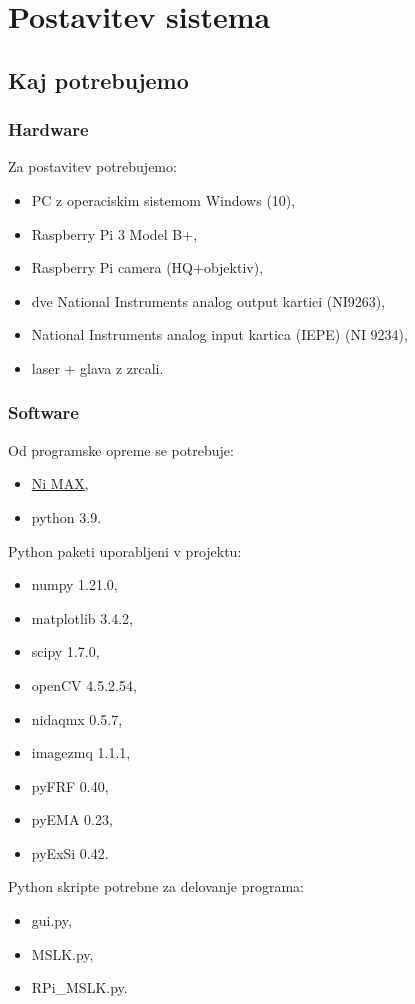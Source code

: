 \chapter{Postavitev sistema}
\section{Kaj potrebujemo}
\subsection{Hardware}
Za postavitev potrebujemo:
\begin{itemize}
    \item PC z operaciskim sistemom Windows (10),
    \item Raspberry Pi 3 Model B+,
    \item Raspberry Pi camera (HQ+objektiv),
    \item dve National Instruments analog output kartici (NI9263),
    \item National Instruments analog input kartica (IEPE) (NI 9234),
    \item laser + glava z zrcali.
\end{itemize}
\subsection{Software}
Od programske opreme se potrebuje:
\begin{itemize}
    \item \href{https://knowledge.ni.com/KnowledgeArticleDetails?id=kA03q000000YGQwCAO&l=sl-SI}{Ni MAX},
    \item python 3.9.
\end{itemize}
Python paketi uporabljeni v projektu:
\begin{itemize}
    \item numpy 1.21.0,
    \item matplotlib 3.4.2,
    \item scipy 1.7.0,
    \item openCV 4.5.2.54,
    \item nidaqmx 0.5.7,
    \item imagezmq 1.1.1,
    \item pyFRF 0.40,
    \item pyEMA 0.23,
    \item pyExSi 0.42.
\end{itemize}
Python skripte potrebne za delovanje programa:
\begin{itemize}
    \item gui.py,
    \item MSLK.py,
    \item RPi\_MSLK.py.
\end{itemize}


